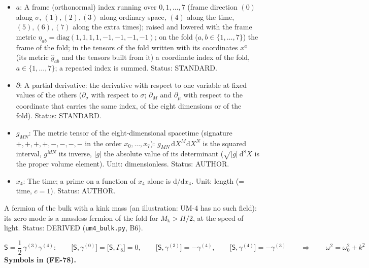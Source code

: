 \documentclass[
  10pt,
]{article}
\begin{document}
\begin{itemize}
  along the coordinates, \(\gamma^M = \mathbf{e}_a{}^MT^a\),
  \(\gamma_M = g_{MN}\gamma^N\); \(\gamma^{(a)} = T^a\) along the frame
  direction \((a)\) (\(\gamma^{(0)}\) along \(\sigma\), \(\gamma^{(4)}\)
  along the time). Unit: dimensionless. Status: AUTHOR.
\item
  \(a\): A frame (orthonormal) index running over \(0, 1, \dots, 7\)
  (frame direction \((0)\) along \(\sigma\), \((1), (2), (3)\) along
  ordinary space, \((4)\) along the time, \((5), (6), (7)\) along the
  extra times); raised and lowered with the frame metric
  \(\eta_{ab} = \mathrm{diag}(1, 1, 1, 1, -1, -1, -1, -1)\); on the fold
  (\(a, b \in \{1, \dots, 7\}\)) the frame of the fold; in the tensors
  of the fold written with its coordinates \(x^a\) (its metric
  \(\hat g_{ab}\) and the tensors built from it) a coordinate index of
  the fold, \(a \in \{1, \dots, 7\}\); a repeated index is summed.
  Status: STANDARD.
\item
  \(\partial\): A partial derivative: the derivative with respect to one
  variable at fixed values of the others (\(\partial_\sigma\) with
  respect to \(\sigma\); \(\partial_M\) and \(\partial_\mu\) with
  respect to the coordinate that carries the same index, of the eight
  dimensions or of the fold). Status: STANDARD.
\item
  \(g_{MN}\): The metric tensor of the eight-dimensional spacetime
  (signature \(+,+,+,+,-,-,-,-\) in the order \(x_0, \dots, x_7\)):
  \(g_{MN}\,\mathrm{d}X^M\mathrm{d}X^N\) is the squared interval,
  \(g^{MN}\) its inverse, \(\lvert g\rvert\) the absolute value of its
  determinant (\(\sqrt{\lvert g\rvert}\,\mathrm{d}^8X\) is the proper
  volume element). Unit: dimensionless. Status: AUTHOR.
\item
  \(x_4\): The time; a prime on a function of \(x_4\) alone is
  \(\mathrm{d}/\mathrm{d}x_4\). Unit: length (= time, \(c = 1\)).
  Status: AUTHOR.
\end{itemize}

A fermion of the bulk with a kink mass (an illustration: UM-4 has no
such field): its zero mode is a massless fermion of the fold for
\(M_{\mathrm{k}} > H/2\), at the speed of light. Status: DERIVED
(\texttt{um4\_bulk.py}, B6).

\[
\mathsf{S} = \frac12\,\gamma^{(3)}\gamma^{(4)}:\qquad
\big[\mathsf{S}, \gamma^{(0)}\big] = \big[\mathsf{S}, \Gamma_8\big] = 0,\qquad
\big[\mathsf{S}, \gamma^{(3)}\big] = -\gamma^{(4)},\qquad \big[\mathsf{S}, \gamma^{(4)}\big] = -\gamma^{(3)}\qquad\Rightarrow\qquad
\omega^2 = \omega_0^2 + k^2 \tag{FE-78}
\] \textbf{Symbols in (FE-78).}
\end{document}
